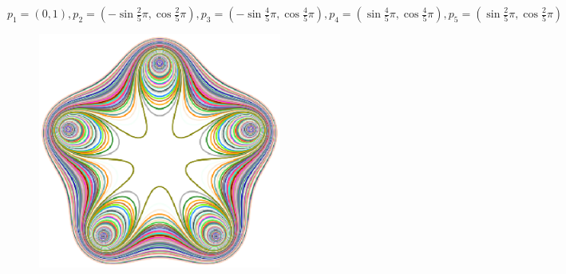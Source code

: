 \documentclass{article}
\begin{document}
\begin{exa}
$p_1 =(0,1), p_2=(-\sin{\frac{2}{5}\pi},\cos{\frac{2}{5}\pi}), p_3=(-\sin{\frac{4}{5}\pi},\cos{\frac{4}{5}\pi}), p_4=(\sin{\frac{4}{5}\pi},\cos{\frac{4}{5}\pi}), p_5=(\sin{\frac{2}{5}\pi},\cos{\frac{2}{5}\pi})$
\begin{figure}[H]
\begin{center}
\includegraphics[width=8cm]{cassini5_star.eps}
\caption{}
\label{ }
\end{center}
\end{figure}
\end{exa}
\end{document}
